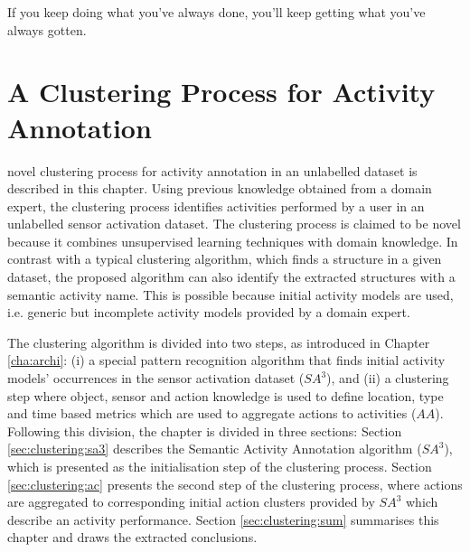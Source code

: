 

\begin{savequote}[50mm]
If you keep doing what you've always done, you'll keep getting what you've always gotten.
\end{savequote}


\chapter{A Clustering Process for Activity Annotation}
\label{cha:clustering}

\ifpdf
    \graphicspath{{4_clustering_process/figures/PDF/}{4_clustering_process/figures/PNG/}{4_clustering_process/figures/}}
\else
    \graphicspath{{4_clustering_process/figures/EPS/}{4_clustering_process/figures/}}
\fi

 novel clustering process for activity annotation in an unlabelled dataset is described in this chapter. Using previous knowledge obtained from a domain expert, the clustering process identifies activities performed by a user in an unlabelled sensor activation dataset. The clustering process is claimed to be novel because it combines unsupervised learning techniques with domain knowledge. In contrast with a typical clustering algorithm, which finds a structure in a given dataset, the proposed algorithm can also identify the extracted structures with a semantic activity name. This is possible because initial activity models are used, i.e. generic but incomplete activity models provided by a domain expert. 

The clustering algorithm is divided into two steps, as introduced in Chapter \ref{cha:archi}: (i) a special pattern recognition algorithm that finds initial activity models' occurrences in the sensor activation dataset ($SA^3$), and (ii) a clustering step where object, sensor and action knowledge is used to define location, type and time based metrics which are used to aggregate actions to activities ($AA$). Following this division, the chapter is divided in three sections: Section \ref{sec:clustering:sa3} describes the Semantic Activity Annotation algorithm ($SA^3$), which is presented as the initialisation step of the clustering process. Section \ref{sec:clustering:ac} presents the second step of the clustering process, where actions are aggregated to corresponding initial action clusters provided by $SA^3$ which describe an activity performance. Section \ref{sec:clustering:sum} summarises this chapter and draws the extracted conclusions.

